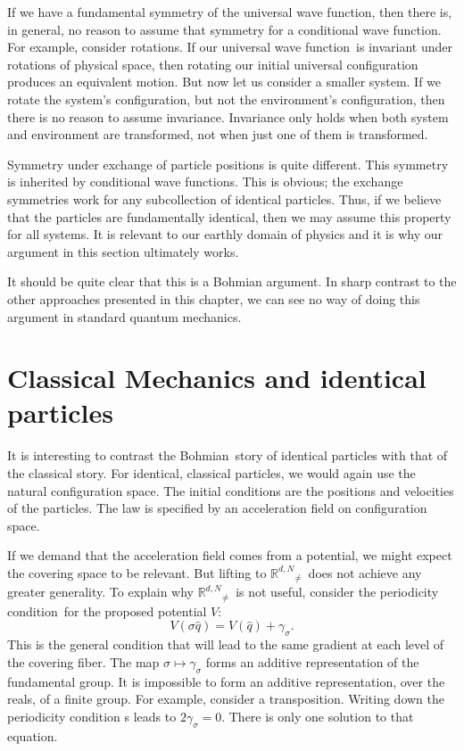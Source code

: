 \documentclass[11pt]{article}
\theoremstyle{remark}
\begin{document}
If we have a fundamental
symmetry of the universal wave function, then there is, in general, no reason to
assume that symmetry for a conditional wave function. For example, consider
rotations. If our universal wave function\ is invariant under rotations of
physical space, then rotating our initial universal configuration
produces an equivalent motion. But now let us consider a
smaller system. If we rotate the system's configuration, but not the
environment's configuration, then there is no reason to assume
invariance. Invariance only holds when both system and environment are
transformed, not when just one of them is transformed. 

Symmetry under exchange of particle positions is quite different. This
symmetry is inherited by conditional wave functions. This is obvious; the
exchange symmetries work for any subcollection of identical
particles. Thus, if we believe that the particles are fundamentally
identical, then we may assume this property for all systems. It is
relevant to our earthly domain of physics and it is why our argument
in this section ultimately works. 

It should be quite clear that this is a Bohmian argument. In sharp
contrast to 
 the other approaches presented in this chapter, we can see no way of
doing this argument in standard quantum mechanics.


\section{Classical Mechanics and identical particles} \label{s:cm} 


It is interesting to contrast the Bohmian\ story of identical
particles with that of the classical story. For identical, classical particles,
we would again use the natural configuration space. The initial
conditions are the positions and velocities of the particles. The law
is specified by an acceleration field on configuration space. 

If we demand that  the acceleration field  comes from a potential,
we might expect the covering space to be relevant. But lifting to
\ensuremath{\ensuremath{\mathbb{R}^{d,N}}_{\neq}}\ does not achieve any greater generality. To explain why  \ensuremath{\ensuremath{\mathbb{R}^{d,N}}_{\neq}}\
is not useful, 
consider the periodicity condition\ for the proposed potential $V$:  
\begin{equation*}
V(\ensuremath{\sigma} \ensuremath{\hat{q}}) = V(\ensuremath{\hat{q}}) + \ensuremath{\gamma_{\ensuremath{\sigma}}}.
\end{equation*}
This is the general condition that will lead to the same gradient at
each level of the covering fiber. 
The map $\ensuremath{\sigma} \mapsto \ensuremath{\gamma_{\ensuremath{\sigma}}}$ forms an additive representation  of the
fundamental group. It is impossible to form an additive
representation, over the reals, 
of a finite group. For example,  consider a
transposition. Writing down the periodicity condition s leads to $2 \ensuremath{\gamma_{\ensuremath{\sigma}}} =
0$. There is only one solution to that equation. 
\end{document}
